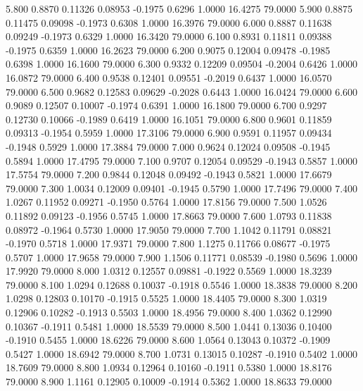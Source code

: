    5.800   0.8870   0.11326   0.08953  -0.1975   0.6296   1.0000  16.4275  79.0000
   5.900   0.8875   0.11475   0.09098  -0.1973   0.6308   1.0000  16.3976  79.0000
   6.000   0.8887   0.11638   0.09249  -0.1973   0.6329   1.0000  16.3420  79.0000
   6.100   0.8931   0.11811   0.09388  -0.1975   0.6359   1.0000  16.2623  79.0000
   6.200   0.9075   0.12004   0.09478  -0.1985   0.6398   1.0000  16.1600  79.0000
   6.300   0.9332   0.12209   0.09504  -0.2004   0.6426   1.0000  16.0872  79.0000
   6.400   0.9538   0.12401   0.09551  -0.2019   0.6437   1.0000  16.0570  79.0000
   6.500   0.9682   0.12583   0.09629  -0.2028   0.6443   1.0000  16.0424  79.0000
   6.600   0.9089   0.12507   0.10007  -0.1974   0.6391   1.0000  16.1800  79.0000
   6.700   0.9297   0.12730   0.10066  -0.1989   0.6419   1.0000  16.1051  79.0000
   6.800   0.9601   0.11859   0.09313  -0.1954   0.5959   1.0000  17.3106  79.0000
   6.900   0.9591   0.11957   0.09434  -0.1948   0.5929   1.0000  17.3884  79.0000
   7.000   0.9624   0.12024   0.09508  -0.1945   0.5894   1.0000  17.4795  79.0000
   7.100   0.9707   0.12054   0.09529  -0.1943   0.5857   1.0000  17.5754  79.0000
   7.200   0.9844   0.12048   0.09492  -0.1943   0.5821   1.0000  17.6679  79.0000
   7.300   1.0034   0.12009   0.09401  -0.1945   0.5790   1.0000  17.7496  79.0000
   7.400   1.0267   0.11952   0.09271  -0.1950   0.5764   1.0000  17.8156  79.0000
   7.500   1.0526   0.11892   0.09123  -0.1956   0.5745   1.0000  17.8663  79.0000
   7.600   1.0793   0.11838   0.08972  -0.1964   0.5730   1.0000  17.9050  79.0000
   7.700   1.1042   0.11791   0.08821  -0.1970   0.5718   1.0000  17.9371  79.0000
   7.800   1.1275   0.11766   0.08677  -0.1975   0.5707   1.0000  17.9658  79.0000
   7.900   1.1506   0.11771   0.08539  -0.1980   0.5696   1.0000  17.9920  79.0000
   8.000   1.0312   0.12557   0.09881  -0.1922   0.5569   1.0000  18.3239  79.0000
   8.100   1.0294   0.12688   0.10037  -0.1918   0.5546   1.0000  18.3838  79.0000
   8.200   1.0298   0.12803   0.10170  -0.1915   0.5525   1.0000  18.4405  79.0000
   8.300   1.0319   0.12906   0.10282  -0.1913   0.5503   1.0000  18.4956  79.0000
   8.400   1.0362   0.12990   0.10367  -0.1911   0.5481   1.0000  18.5539  79.0000
   8.500   1.0441   0.13036   0.10400  -0.1910   0.5455   1.0000  18.6226  79.0000
   8.600   1.0564   0.13043   0.10372  -0.1909   0.5427   1.0000  18.6942  79.0000
   8.700   1.0731   0.13015   0.10287  -0.1910   0.5402   1.0000  18.7609  79.0000
   8.800   1.0934   0.12964   0.10160  -0.1911   0.5380   1.0000  18.8176  79.0000
   8.900   1.1161   0.12905   0.10009  -0.1914   0.5362   1.0000  18.8633  79.0000
